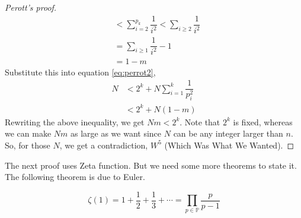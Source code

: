 \documentclass{subfiles}
\begin{document}
\begin{proof}[Perott's proof]
\begin{align*}
												 & < \sum_{i=2}^{p_k} \dfrac 1{i^2}  < \sum_{i\geq 2}\dfrac 1{i^2}\\
												 & = \sum_{i\geq 1}\dfrac 1{i^2} - 1\\
												 & = 1-m
				\end{align*}
			Substitute this into equation \eqref{eq:perrot2},
				\begin{align*}
						N		& < 2^k+N\sum_{i=1}^k\dfrac 1{p_i^2}\\
								& < 2^k+N(1-m)
				\end{align*}
			Rewriting the above inequality, we get $Nm  <  2^k$. Note that $2^k$ is fixed, whereas we can make $Nm$ as large as we want since $N$ can be any integer larger than $n$. So, for those $N$, we get a contradiction, $W^5$ (Which Was What We Wanted).
		\end{proof}
	The next proof uses Zeta function. But we need some more theorems to state it. The following theorem is due to Euler.
		\begin{theorem}
			\[\zeta(1)=1+\dfrac{1}{2}+\dfrac{1}{3}+\cdots=\prod_{p\in\mathbb{P}}\dfrac{p}{p-1}\]\label{thm:zeta1}
		\end{theorem}
\end{document}
